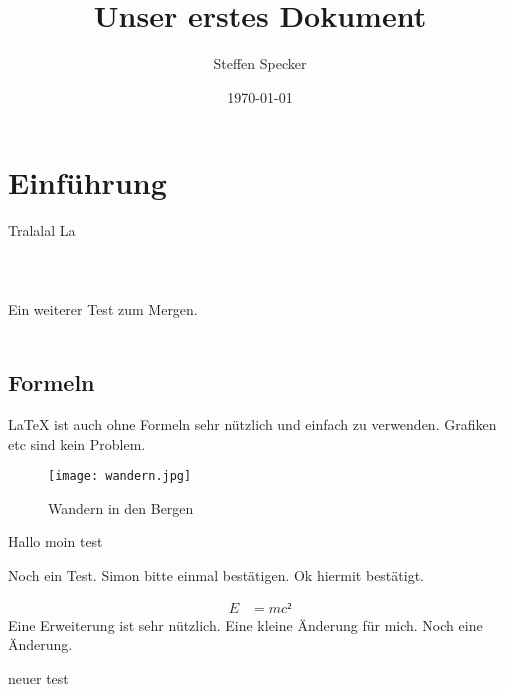 \documentclass[12pt,a4paper]{article}
\author{Steffen Specker}
\title{Unser erstes Dokument}
\date{\today}
\begin{document}
\maketitle
\tableofcontents

\newpage

\section{Einführung}

Tralalal La
\\
\\
\\
\\
Ein weiterer Test zum Mergen.
\\
\\




\subsection{Formeln}

\LaTeX{} ist auch ohne Formeln sehr nützlich und einfach zu verwenden. Grafiken etc sind kein Problem.


\begin{figure}[h]
\begin{center}
\texttt{[image: wandern.jpg]}
\caption{Wandern in den Bergen}
\label{wandern.pgtest}

\end{center}
\end{figure}

Hallo moin test

Noch ein Test. Simon bitte einmal bestätigen. Ok hiermit bestätigt.

\begin{align*}
E &= mc²
\end{align*}
Eine Erweiterung ist sehr nützlich.
Eine kleine Änderung für mich.
Noch eine Änderung.


neuer test 
\end{document}
